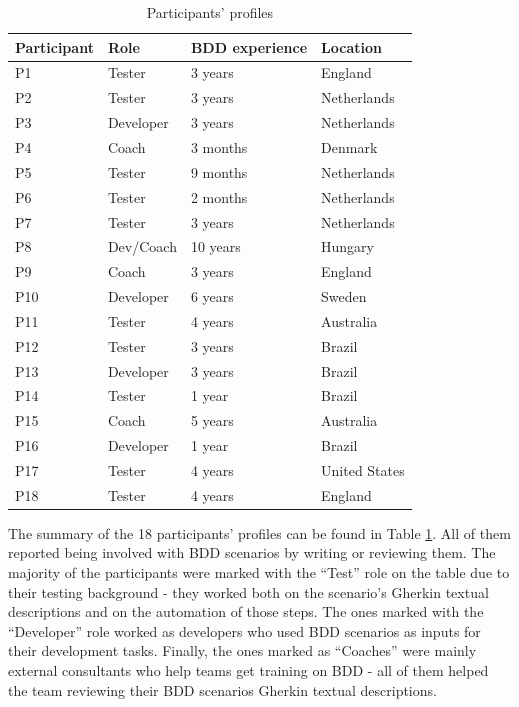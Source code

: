 \begin{table}[!b]
	\caption{Participants' profiles}
	\label{tbl:profiles}
	\centering
	\begin{tabular}{|m{3cm}|m{3cm}|m{4cm}|m{4cm}|}
		\hline
		\textbf{Participant} & \textbf{Role} & \textbf{BDD experience} & \textbf{Location}\\
		\hline
		P1 & Tester & 3 years & England\\
		\hline
		P2 & Tester & 3 years & Netherlands\\
		\hline
		P3 & Developer & 3 years & Netherlands\\
		\hline
		P4 & Coach & 3 months & Denmark\\
		\hline
		P5 & Tester & 9 months & Netherlands\\
		\hline
		P6 & Tester & 2 months & Netherlands\\
		\hline
		P7 & Tester & 3 years & Netherlands\\
		\hline
		P8 & Dev/Coach & 10 years & Hungary\\
		\hline
		P9 & Coach & 3 years & England\\
		\hline
		P10 & Developer & 6 years & Sweden\\
		\hline
		P11 & Tester & 4 years & Australia\\
		\hline
		P12 & Tester & 3 years & Brazil\\
		\hline
		P13 & Developer & 3 years & Brazil\\
		\hline
		P14 & Tester & 1 year & Brazil\\
		\hline
		P15 & Coach & 5 years & Australia\\
		\hline
		P16 & Developer & 1 year & Brazil\\
		\hline
		P17 & Tester & 4 years & United States\\
		\hline
		P18 & Tester & 4 years & England\\
		\hline
	\end{tabular}
\end{table}

The summary of the 18 participants' profiles can be found in Table \ref{tbl:profiles}. All of them reported being involved with BDD scenarios by writing or reviewing them. The majority of the participants were marked with the ``Test'' role on the table due to their testing background - they worked both on the scenario's Gherkin textual descriptions and on the automation of those steps. The ones marked with the ``Developer'' role worked as developers who used BDD scenarios as inputs for their development tasks. Finally, the ones marked as ``Coaches'' were mainly external consultants who help teams get training on BDD - all of them helped the team reviewing their BDD scenarios Gherkin textual descriptions.

